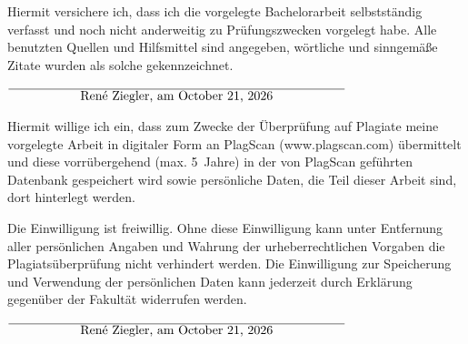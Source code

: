\documentclass[12pt,oneside,a4paper,parskip]{scrbook}
\def\BaAuthor{René Ziegler}
\begin{document}
\backmatter

\listoffigures
{}

\listoftables

\lstlistoflistings
{}

\printbibliography
{}



Hiermit versichere ich, dass ich die vorgelegte Bachelorarbeit selbstständig verfasst und noch nicht anderweitig zu Prüfungszwecken vorgelegt habe. Alle benutzten Quellen und Hilfsmittel sind angegeben, wörtliche und sinngemäße Zitate wurden als solche gekennzeichnet.

\vspace{20pt}
\begin{flushright}
$\overline{~~~~~~~~~~~~~~~~~\mbox{\BaAuthor, am \today}~~~~~~~~~~~~~~~~~}$
\end{flushright}


Hiermit willige ich ein, dass zum Zwecke der Überprüfung auf Plagiate meine vorgelegte Arbeit in digitaler Form an PlagScan (www.plagscan.com) übermittelt und diese vorrübergehend (max. 5~Jahre) in der von PlagScan geführten Datenbank gespeichert wird sowie persönliche Daten, die Teil dieser Arbeit sind, dort hinterlegt werden.

\begin{small}
Die Einwilligung ist freiwillig. Ohne diese Einwilligung kann unter Entfernung aller persönlichen Angaben und Wahrung der urheberrechtlichen Vorgaben die Plagiatsüberprüfung nicht verhindert werden. Die Einwilligung zur Speicherung und Verwendung der persönlichen Daten kann jederzeit durch Erklärung gegenüber der Fakultät widerrufen werden.
\end{small}

\vspace{20pt}
\begin{flushright}
$\overline{~~~~~~~~~~~~~~~~~\mbox{\BaAuthor, am \today}~~~~~~~~~~~~~~~~~}$
\end{flushright}
\end{document}
